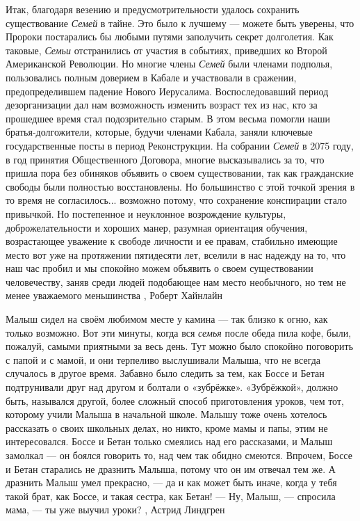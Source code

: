 Итак, благодаря везению и предусмотрительности удалось сохранить существование
\emph{Семей} в тайне. Это было к лучшему — можете быть уверены, что Пророки
постарались бы любыми путями заполучить секрет долголетия.  Как таковые,
\emph{Семьи} отстранились от участия в событиях, приведших ко Второй
Американской Революции. Но многие члены \emph{Семей} были членами подполья,
пользовались полным доверием в Кабале и участвовали в сражении,
предопределившем падение Нового Иерусалима. Воспоследовавший период
дезорганизации дал нам возможность изменить возраст тех из нас, кто за
прошедшее время стал подозрительно старым. В этом весьма помогли наши
братья-долгожители, которые, будучи членами Кабала, заняли ключевые
государственные посты в период Реконструкции.  На собрании \emph{Семей} в 2075
году, в год принятия Общественного Договора, многие высказывались за то, что
пришла пора без обиняков объявить о своем существовании, так как гражданские
свободы были полностью восстановлены. Но большинство с этой точкой зрения в то
время не согласилось... возможно потому, что сохранение конспирации стало
привычкой. Но постепенное и неуклонное возрождение культуры, доброжелательности
и хороших манер, разумная ориентация обучения, возрастающее уважение к свободе
личности и ее правам, стабильно имеющие место вот уже на протяжении пятидесяти
лет, вселили в нас надежду на то, что наш час пробил и мы спокойно можем
объявить о своем существовании человечеству, заняв среди людей подобающее нам
место необычного, но тем не менее уважаемого меньшинства
, Роберт Хайнлайн

Малыш сидел на своём любимом месте у камина — так близко к огню, как только возможно.
Вот эти минуты, когда вся \emph{семья} после обеда пила кофе, были, пожалуй, самыми
приятными за весь день. Тут можно было спокойно поговорить с папой и с мамой, и
они терпеливо выслушивали Малыша, что не всегда случалось в другое время.
Забавно было следить за тем, как Боссе и Бетан подтрунивали друг над другом и
болтали о «зубрёжке». «Зубрёжкой», должно быть, назывался другой, более сложный
способ приготовления уроков, чем тот, которому учили Малыша в начальной школе.
Малышу тоже очень хотелось рассказать о своих школьных делах, но никто, кроме
мамы и папы, этим не интересовался. Боссе и Бетан только смеялись над его
рассказами, и Малыш замолкал — он боялся говорить то, над чем так обидно
смеются. Впрочем, Боссе и Бетан старались не дразнить Малыша, потому что он им
отвечал тем же. А дразнить Малыш умел прекрасно, — да и как может быть иначе,
когда у тебя такой брат, как Боссе, и такая сестра, как Бетан!
— Ну, Малыш, — спросила мама, — ты уже выучил уроки?
, Астрид Линдгрен

